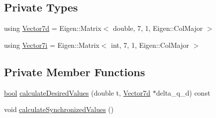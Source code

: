 \subsection*{Private Types}
\begin{DoxyCompactItemize}
\item 
using \hyperlink{classMotionGenerator_a499bd17d3a5c7583b4c06923f532185d}{Vector7d} = Eigen\+::\+Matrix$<$ double, 7, 1, Eigen\+::\+Col\+Major $>$
\item 
using \hyperlink{classMotionGenerator_ad0a869ececb7689b512dbfbf8f507924}{Vector7i} = Eigen\+::\+Matrix$<$ int, 7, 1, Eigen\+::\+Col\+Major $>$
\end{DoxyCompactItemize}
\subsection*{Private Member Functions}
\begin{DoxyCompactItemize}
\item 
\hyperlink{classbool}{bool} \hyperlink{classMotionGenerator_a7d436455ec33c3cbe8427b6d8611c83f}{calculate\+Desired\+Values} (double t, \hyperlink{classMotionGenerator_a499bd17d3a5c7583b4c06923f532185d}{Vector7d} $\ast$delta\+\_\+q\+\_\+d) const
\item 
void \hyperlink{classMotionGenerator_aa366f6b1183f1c0f8c4fb745d7a927d2}{calculate\+Synchronized\+Values} ()
\end{DoxyCompactItemize}
